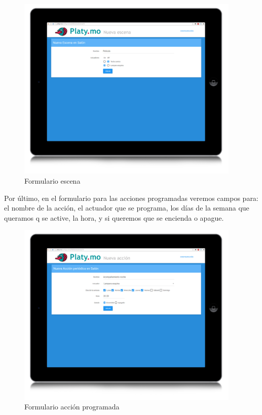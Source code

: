     \begin{figure}[h!]
        \centering
        \includegraphics[width=0.95\textwidth]{imagenes/conf_esc.jpg}
        \caption{Formulario escena}
        \label{fig:form_esc}
    \end{figure}
    
    Por último, en el formulario para las acciones programadas veremos campos para: el nombre de la acción, el actuador que se programa, los días de la semana que queramos q se active, la hora, y si queremos que se encienda o apague.
    
    \begin{figure}[h!]
        \centering
        \includegraphics[width=0.95\textwidth]{imagenes/conf_accion.jpg}
        \caption{Formulario acción programada}
        \label{fig:form_acc}
    \end{figure}
    

